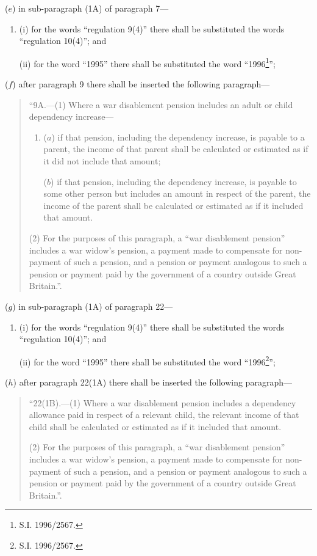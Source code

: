 \documentclass[12pt,a4paper]{article}
\begin{document}
\begin{enumerate}
($e$) in sub-paragraph (1A) of paragraph 7—
\begin{enumerate}\item[]
(i) for the words “regulation 9(4)” there shall be substituted the words “regulation 10(4)”; and

(ii) for the word “1995” there shall be substituted the word “1996\footnote{\frenchspacing S.I. 1996/2567.}”;
\end{enumerate}

($f$) after paragraph 9 there shall be inserted the following paragraph—
\begin{quotation}
“9A.—(1) Where a war disablement pension includes an adult or child dependency increase—
\begin{enumerate}\item[]
($a$) if that pension, including the dependency increase, is payable to a parent, the income of that parent shall be calculated or estimated as if it did not include that amount;

\begin{sloppypar}
($b$) if that pension, including the dependency increase, is payable to some other person but includes an amount in respect of the parent, the income of the parent shall be calculated or estimated as if it included that amount.
\end{sloppypar}
\end{enumerate}

(2) For the purposes of this paragraph, a “war disablement pension” includes a war widow’s pension, a payment made to compensate for non-payment of such a pension, and a pension or payment analogous to such a pension or payment paid by the government of a country outside Great Britain.”.
\end{quotation}

($g$) in sub-paragraph (1A) of paragraph 22—
\begin{enumerate}\item[]
(i) for the words “regulation 9(4)” there shall be substituted the words “regulation 10(4)”; and

(ii) for the word “1995” there shall be substituted the word “1996\footnote{\frenchspacing S.I. 1996/2567.}”;
\end{enumerate}

($h$) after paragraph 22(1A) there shall be inserted the following paragraph—

\begin{quotation}
“22(1B).—(1) Where a war disablement pension includes a dependency allowance paid in respect of a relevant child, the relevant income of that child shall be calculated or estimated as if it included that amount.

(2) For the purposes of this paragraph, a “war disablement pension” includes a war widow’s pension, a payment made to compensate for non-payment of such a pension, and a pension or payment analogous to such a pension or payment paid by the government of a country outside Great Britain.”.
\end{quotation}
\end{enumerate}
\end{document}
